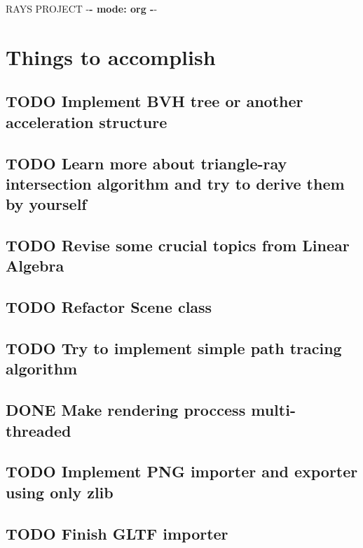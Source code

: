 \documentclass[11pt]{article}
\author{awess}
\date{\today}
\title{}
\begin{document}
\tableofcontents

RAYS PROJECT -\textbf{- mode: org -}-

\section{Things to accomplish}
\label{sec:orgb04b18c}
\subsection{{\bfseries\sffamily TODO} Implement BVH tree or another acceleration structure}
\label{sec:org6e92e4a}
\subsection{{\bfseries\sffamily TODO} Learn more about triangle-ray intersection algorithm and try to derive them by yourself}
\label{sec:org8889b67}
\subsection{{\bfseries\sffamily TODO} Revise some crucial topics from Linear Algebra}
\label{sec:org7f59b18}
\subsection{{\bfseries\sffamily TODO} Refactor Scene class}
\label{sec:org0913957}
\subsection{{\bfseries\sffamily TODO} Try to implement simple path tracing algorithm}
\label{sec:orgce2d2f9}
\subsection{{\bfseries\sffamily DONE} Make rendering proccess multi-threaded}
\label{sec:orgcdd27e2}
\subsection{{\bfseries\sffamily TODO} Implement PNG importer and exporter using only zlib}
\label{sec:org03c9e7c}
\subsection{{\bfseries\sffamily TODO} Finish GLTF importer}
\label{sec:orgb099f12}
\end{document}
